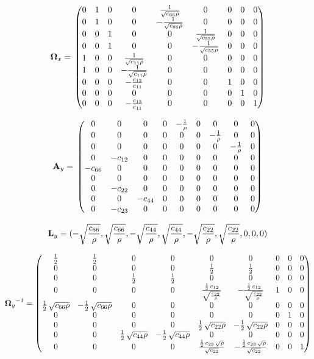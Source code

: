\[\mathbf{\Omega}_x = \\
\begin{pmatrix}0 & 1 & 0 & 0 & \frac{1}{\sqrt{c_{66} \rho}} & 0 & 0 & 0 & 0\cr 0 & 1 & 0 & 0 & -\frac{1}{\sqrt{c_{66} \rho}} & 0 & 0 & 0 & 0\cr 0 & 0 & 1 & 0 & 0 & \frac{1}{\sqrt{c_{55} \rho}} & 0 & 0 & 0\cr 0 & 0 & 1 & 0 & 0 & -\frac{1}{\sqrt{c_{55} \rho}} & 0 & 0 & 0\cr 1 & 0 & 0 & \frac{1}{\sqrt{c_{11} \rho}} & 0 & 0 & 0 & 0 & 0\cr 1 & 0 & 0 & -\frac{1}{\sqrt{c_{11} \rho}} & 0 & 0 & 0 & 0 & 0\cr 0 & 0 & 0 & -\frac{c_{12}}{c_{11}} & 0 & 0 & 1 & 0 & 0\cr 0 & 0 & 0 & 0 & 0 & 0 & 0 & 1 & 0\cr 0 & 0 & 0 & -\frac{c_{13}}{c_{11}} & 0 & 0 & 0 & 0 & 1\end{pmatrix}\]


\[\mathbf{A}_y = \\
\begin{pmatrix}0 & 0 & 0 & 0 & -\frac{1}{\rho} & 0 & 0 & 0 & 0\cr 0 & 0 & 0 & 0 & 0 & 0 & -\frac{1}{\rho} & 0 & 0\cr 0 & 0 & 0 & 0 & 0 & 0 & 0 & -\frac{1}{\rho} & 0\cr 0 & -c_{12} & 0 & 0 & 0 & 0 & 0 & 0 & 0\cr -c_{66} & 0 & 0 & 0 & 0 & 0 & 0 & 0 & 0\cr 0 & 0 & 0 & 0 & 0 & 0 & 0 & 0 & 0\cr 0 & -c_{22} & 0 & 0 & 0 & 0 & 0 & 0 & 0\cr 0 & 0 & -c_{44} & 0 & 0 & 0 & 0 & 0 & 0\cr 0 & -c_{23} & 0 & 0 & 0 & 0 & 0 & 0 & 0\end{pmatrix}\]


\[\mathbf{L}_y = \\
(-\sqrt{\frac{c_{66}}{\rho}},\sqrt{\frac{c_{66}}{\rho}},-\sqrt{\frac{c_{44}}{\rho}},\sqrt{\frac{c_{44}}{\rho}},-\sqrt{\frac{c_{22}}{\rho}},\sqrt{\frac{c_{22}}{\rho}}, 0, 0, 0)\]


\[{\mathbf{\Omega}_y}^{-1} = 
\begin{pmatrix}\frac{1}{2} & \frac{1}{2} & 0 & 0 & 0 & 0 & 0 & 0 & 0\cr 0 & 0 & 0 & 0 & \frac{1}{2} & \frac{1}{2} & 0 & 0 & 0\cr 0 & 0 & \frac{1}{2} & \frac{1}{2} & 0 & 0 & 0 & 0 & 0\cr 0 & 0 & 0 & 0 & \frac{\frac{1}{2}\,c_{12}}{\sqrt{\frac{c_{22}}{\rho}}} & -\frac{\frac{1}{2}\,c_{12}}{\sqrt{\frac{c_{22}}{\rho}}} & 1 & 0 & 0\cr \frac{1}{2}\,\sqrt{c_{66} \rho} & -\frac{1}{2}\,\sqrt{c_{66} \rho} & 0 & 0 & 0 & 0 & 0 & 0 & 0\cr 0 & 0 & 0 & 0 & 0 & 0 & 0 & 1 & 0\cr 0 & 0 & 0 & 0 & \frac{1}{2}\,\sqrt{c_{22} \rho} & -\frac{1}{2}\,\sqrt{c_{22} \rho} & 0 & 0 & 0\cr 0 & 0 & \frac{1}{2}\,\sqrt{c_{44} \rho} & -\frac{1}{2}\,\sqrt{c_{44} \rho} & 0 & 0 & 0 & 0 & 0\cr 0 & 0 & 0 & 0 & \frac{\frac{1}{2}\,c_{23}\,\sqrt{\rho}}{\sqrt{c_{22}}} & -\frac{\frac{1}{2}\,c_{23}\,\sqrt{\rho}}{\sqrt{c_{22}}} & 0 & 0 & 1\end{pmatrix}\]

